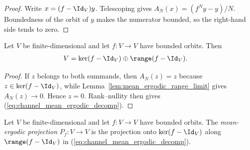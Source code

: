 \begin{proof}\leanok
    Write $x=(f-\Id_V)y$. Telescoping gives
    $A_N(x)=(f^Ny-y)/N$. Boundedness of the orbit of $y$ makes the
    numerator bounded, so the right-hand side tends to zero.
\end{proof}

\begin{lemma}
    \label{lem:mean_ergodic_complementarity}
    \leanok
    Let $V$ be finite-dimensional and let $f:V\to V$ have bounded orbits.
    Then
    \begin{align}
        V
         & =\ker(f-\Id_V)\oplus\range(f-\Id_V).
        \label{eq:channel_mean_ergodic_decomp}
    \end{align}
\end{lemma}

\begin{proof}\leanok
    If $z$ belongs to both summands, then $A_N(z)=z$ because
    $z\in\ker(f-\Id_V)$, while Lemma~\ref{lem:mean_ergodic_range_limit} gives
    $A_N(z)\to0$. Hence $z=0$. Rank--nullity then gives
    (\ref{eq:channel_mean_ergodic_decomp}).
\end{proof}

\begin{definition}
    \label{def:mean_ergodic_projection}
    \leanok
    Let $V$ be finite-dimensional and let $f:V\to V$ have bounded orbits.
    The \emph{mean-ergodic projection} $P_f:V\to V$ is the projection onto
    $\ker(f-\Id_V)$ along $\range(f-\Id_V)$ in
    (\ref{eq:channel_mean_ergodic_decomp}).
\end{definition}

